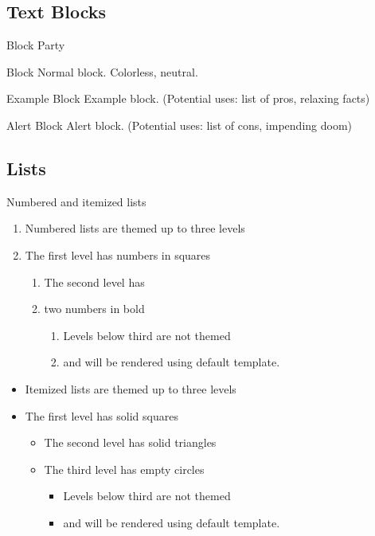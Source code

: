 \documentclass[11pt,c]{beamer}
\begin{document}
\subsection{Text Blocks}
	\begin{frame}{Block Party}
		\begin{block}{Block}
			Normal block. Colorless, neutral.
		\end{block}
		
		\begin{exampleblock}{Example Block}
			Example block. (Potential uses: list of pros, relaxing facts)
		\end{exampleblock}
		
		\begin{alertblock}{Alert Block}
			Alert block. (Potential uses: list of cons, impending doom)
		\end{alertblock}
	\end{frame}

\subsection{Lists}
	\begin{frame}{Numbered and itemized lists}
	\begin{enumerate}
		\item
			Numbered lists are themed up to three levels			
		\item
			The first level has numbers in squares
		\begin{enumerate}\justifying
			\item
				The second level has
			\item
				two numbers in bold
				\begin{enumerate}\justifying
					\item
						Levels below third are not themed					
					\item 
						and will be rendered using default template.
				\end{enumerate}			
		\end{enumerate}
	\end{enumerate}
	\begin{itemize}
		\item
			Itemized lists are themed up to three levels
		\item
			The first level has solid squares
		\begin{itemize}
			\item
				The second level has solid triangles
			\item
				The third level has empty circles
				\begin{itemize}
					\item
					Levels below third are not themed
					\item
					and will be rendered using default template.	
				\end{itemize}	
		\end{itemize}
	\end{itemize}
	
	\end{frame}
\end{document}
